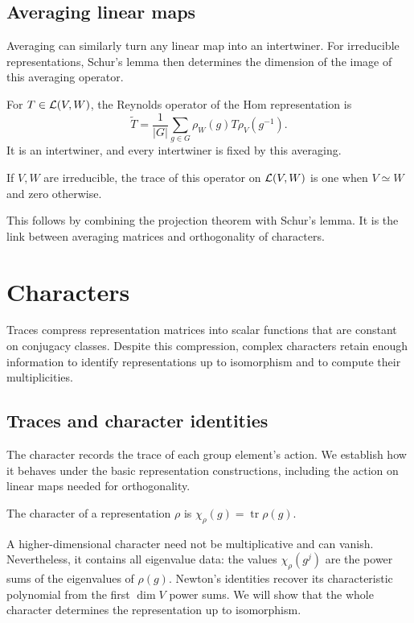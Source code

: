 \subsection{Averaging linear maps}
\label{sect2-application-average}

Averaging can similarly turn any linear map into an intertwiner. For
irreducible representations, Schur's lemma then determines the dimension of
the image of this averaging operator.

\begin{defn}
\label{defn-applications-averages}\label{notation-88}
For $T\in\mathcal{L}(V,W)$, the Reynolds operator of the Hom representation is
\[
 \widetilde T=\frac1{|G|}\sum_{g\in G}\rho_W(g)T\rho_V(g^{-1}).
\]
It is an intertwiner, and every intertwiner is fixed by this averaging.
\end{defn}


\begin{prop}
\label{prop-application-g-morphisms}
If $V,W$ are irreducible, the trace of this operator on $\mathcal{L}(V,W)$ is
one when $V\simeq W$ and zero otherwise.
\end{prop}
This follows by combining the projection theorem with Schur's lemma.
It is the link between averaging matrices and orthogonality of characters.

\section{Characters}

Traces compress representation matrices into scalar functions that are
constant on conjugacy classes. Despite this compression, complex characters
retain enough information to identify representations up to isomorphism and
to compute their multiplicities.

\subsection{Traces and character identities}

The character records the trace of each group element's action. We establish
how it behaves under the basic representation constructions, including the
action on linear maps needed for orthogonality.

\begin{defn}[Character]
\label{notation-89}
The character of a representation $\rho$ is
$\chi_\rho(g)=\operatorname{tr}\rho(g)$.
\end{defn}
A higher-dimensional character need not be multiplicative and can vanish.
Nevertheless, it contains all eigenvalue data: the values
$\chi_\rho(g^j)$ are the power sums of the eigenvalues of $\rho(g)$.
Newton's identities recover its characteristic polynomial from the first
$\dim V$ power sums. We will show that the whole character determines
the representation up to isomorphism.

